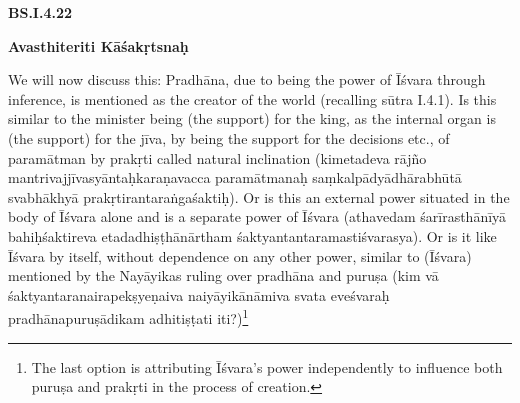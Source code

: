 \textbf{BS.I.4.22}

\textbf{Avasthiteriti Kāśakṛtsnaḥ}


We will now discuss this: Pradhāna, due to being the power of Īśvara through inference, is mentioned as the creator of the world (recalling sūtra I.4.1). Is this similar to the minister being (the support) for the king, as the internal organ is (the support) for the jīva, by being the support for the decisions etc., of paramātman by prakṛti called natural inclination (kimetadeva rājño mantrivajjīvasyāntaḥkaraṇavacca paramātmanaḥ saṃkalpādyādhārabhūtā svabhākhyā prakṛtirantaraṅgaśaktiḥ). Or is this an external power situated in the body of Īśvara alone and is a separate power of Īśvara (athavedam śarīrasthānīyā bahiḥ\-śaktireva etadadhiṣṭhānārtham śaktyantantaramastiśvarasya). Or is it like Īśvara by itself, without dependence on any other power, similar to (Īśvara) mentioned by the Nayāyikas ruling over pradhāna and puruṣa (kim vā śaktyantaranairapekṣyeṇaiva naiyāyikānāmiva svata eveśvaraḥ pradhānapuruṣādikam adhitiṣṭati iti?)\footnote{The last option is attributing Īśvara’s power independently to influence both puruṣa and prakṛti in the process of creation.}

